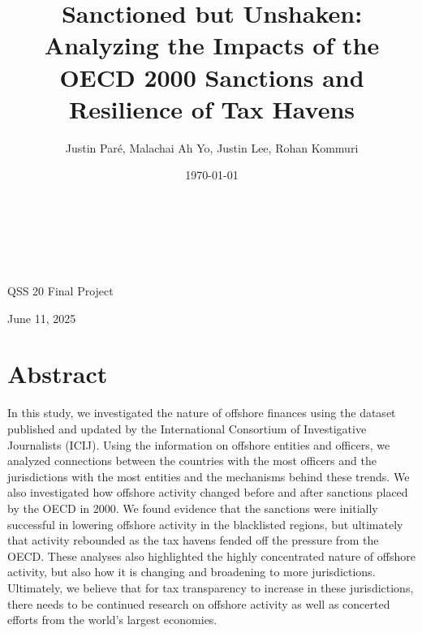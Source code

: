 \documentclass{article}
\begin{document}
\title{Sanctioned but Unshaken: Analyzing the Impacts of the OECD 2000 Sanctions and Resilience of Tax Havens}
\author{Justin Paré, Malachai Ah Yo, Justin Lee, Rohan Kommuri}
\date{\today}

\begin{titlingpage}
    \begin{center}
        \huge \textbf{\thetitle} \\
        \vspace{1em}
    \end{center}


    \begin{center}
        \Large \theauthor \\[1em]
    \end{center}
    
    \begin{center}
        \large
        QSS 20 Final Project 
        \vspace{2em}
    \end{center}

    \begin{center}
        \large June 11, 2025
    \end{center}
\end{titlingpage}


\renewcommand{\contentsname}{Table of Contents}
\tableofcontents

\newpage
\section*{Abstract}
In this study, we investigated the nature of offshore finances using the dataset published and updated by the International Consortium of Investigative Journalists (ICIJ). Using the information on offshore entities and officers, we analyzed connections between the countries with the most officers and the jurisdictions with the most entities and the mechanisms behind these trends. We also investigated how offshore activity changed before and after sanctions placed by the OECD in 2000. We found evidence that the sanctions were initially successful in lowering offshore activity in the blacklisted regions, but ultimately that activity rebounded as the tax havens fended off the pressure from the OECD. These analyses also highlighted the highly concentrated nature of offshore activity, but also how it is changing and broadening to more jurisdictions. Ultimately, we believe that for tax transparency to increase in these jurisdictions, there needs to be continued research on offshore activity as well as concerted efforts from the world’s largest economies.
\end{document}
